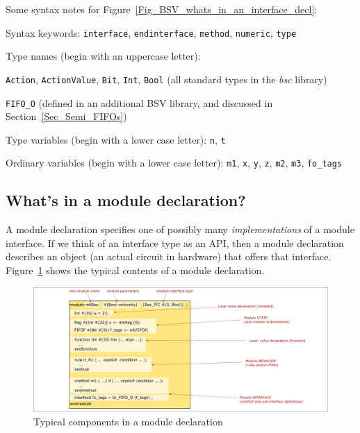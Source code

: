Some syntax notes for Figure~\ref{Fig_BSV_whats_in_an_interface_decl}:
\begin{tightlist}

 \item Syntax keywords: \verb|interface|, \verb|endinterface|,
       \verb|method|, \verb|numeric|, \verb|type|

 \item Type names (begin with an uppercase letter):
  \begin{tightlist}

   \item \verb|Action|, \verb|ActionValue|, \verb|Bit|, \verb|Int|,
         \verb|Bool| (all standard types in the \emph{bsc} library)

   \item \verb|FIFO_O| (defined in an additional BSV library,
          and discussed in Section~\ref{Sec_Semi_FIFOs})
  \end{tightlist}

 \item Type variables (begin with a lower case letter): \verb|n|, \verb|t|

 \item Ordinary variables (begin with a lower case letter): \verb|m1|,
       \verb|x|, \verb|y|, \verb|z|, \verb|m2|, \verb|m3|,
       \verb|fo_tags|

\end{tightlist}


\subsection{What's in a module declaration?}

\label{Sec_Whats_in_a_module_declaration}


A module declaration specifies one of possibly many
\emph{implementations} of a module interface.  If we think of an
interface type as an API, then a module declaration describes an
object (an actual circuit in hardware) that offers that interface.
Figure~\ref{Fig_BSV_whats_in_a_module_decl} shows the typical contents
of a module declaration.
\begin{figure}[htbp]
  \centerline{\includegraphics[width=6in,angle=0]{Figures/Fig_BSV_whats_in_a_module_decl}}
  \caption{\label{Fig_BSV_whats_in_a_module_decl}
           Typical components in a module declaration}
\end{figure}

